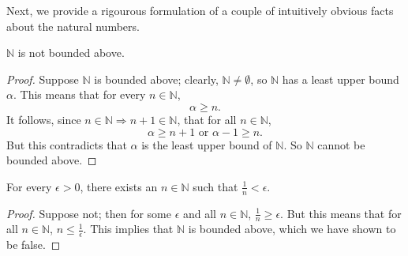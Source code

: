 Next, we provide a rigourous formulation of a couple of intuitively obvious facts about the natural numbers.

\begin{theorem}
$\mathbb{N}$ is not bounded above.

\begin{proof}
Suppose $\mathbb{N}$ is bounded above; clearly, $\mathbb{N} \ne \emptyset$, so $\mathbb{N}$ has a least upper bound $\alpha$. This means that for every $n \in \mathbb{N}$,
\[ \alpha \ge n. \]
It follows, since $n \in \mathbb{N} \Rightarrow n + 1 \in \mathbb{N}$, that for all $n \in \mathbb{N}$,
\[ \alpha \ge n + 1 \textrm{ or } \alpha - 1 \ge n. \]
But this contradicts that $\alpha$ is the least upper bound of $\mathbb{N}$. So $\mathbb{N}$ cannot be bounded above.
\end{proof}
\end{theorem}

\begin{theorem} \label{recip}
For every $\epsilon > 0$, there exists an $n \in \mathbb{N}$ such that $\frac{1}{n} < \epsilon$.

\begin{proof}
Suppose not; then for some $\epsilon$ and all $n \in \mathbb{N}$, $\frac{1}{n} \ge \epsilon$. But this means that for all $n \in \mathbb{N}$, $n \le \frac{1}{\epsilon}$. This implies that $\mathbb{N}$ is bounded above, which we have shown to be false.
\end{proof}
\end{theorem}


